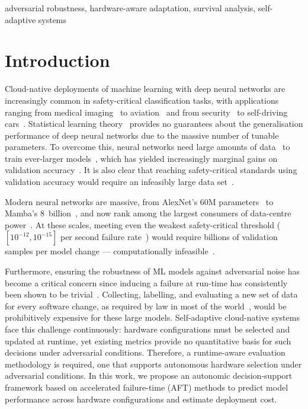 \documentclass[conference]{IEEEtran}%
\begin{document}
\begin{IEEEkeywords}
adversarial robustness, hardware-aware adaptation, survival analysis, self-adaptive systems
\end{IEEEkeywords}




\section{Introduction}
Cloud-native deployments of machine learning with deep neural networks are increasingly common in safety-critical classification tasks, with applications ranging from medical imaging~\cite{ai_medical_imaging} to aviation~\cite{ai_aviation} and from security~\cite{ai_security,ai_luggage,ai_prison} to self-driving cars~\cite{ai_automotive}.
Statistical learning theory~\cite{vcdimension,shalev2014understanding} provides no guarantees about the generalisation performance of deep neural networks due to the massive number of tunable parameters.
To overcome this, neural networks need large amounts of data~\cite{desislavov2021compute,bailly2022effects} to train ever-larger models~\cite{desislavov2021compute}, which has yielded increasingly marginal gains on validation accuracy~\cite{sun2017revisiting}.
It is also clear that reaching safety-critical standards using validation accuracy would require an infeasibly large data set~\cite{meyers}.

Modern neural networks are massive, from AlexNet's 60M parameters~\cite{alom2018history} to Mamba's 8~billion~\cite{mamba}, and now rank among the largest consumers of data-centre power~\cite{msft_water}. At these scales, meeting even the weakest safety-critical threshold ($[10^{-12}, 10^{-15}]$ per second failure rate~\cite{IEC61508,iso26262,aviation_software,safetyframework}) would require billions of validation samples per model change --- computationally infeasible~\cite{meyers}.

Furthermore, ensuring the robustness of ML models against adversarial noise has become a critical concern since inducing a failure at run-time has consistently been shown to be trivial~\cite{adversarialpatch,carlini_towards_2017,croce_reliable_2020,hopskipjump,chakraborty2018adversarial,art2018}.
Collecting, labelling, and evaluating a new set of data for every software change, as required by law in most of the world~\cite{IEC61508,iso26262,aviation_software,safetyframework}, would be prohibitively expensive for these large models.
Self-adaptive cloud-native systems face this challenge continuously: hardware configurations must be selected and updated at runtime, yet existing metrics provide no quantitative basis for such decisions under adversarial conditions.
Therefore, a runtime-aware evaluation methodology is required, one that supports autonomous hardware selection under adversarial conditions.
In this work, we propose an autonomic decision-support framework based on accelerated failure-time (AFT) methods to predict model performance across hardware configurations and estimate deployment cost.
\end{document}
